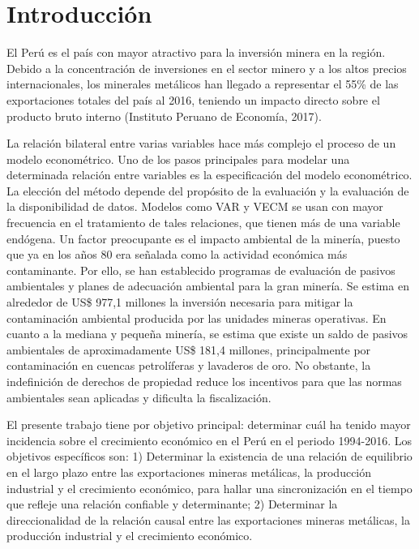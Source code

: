 \documentclass[11pt,]{article}
\begin{document}
\vskip 6.5pt

{
\hypersetup{linkcolor=black}
\setcounter{tocdepth}{2}
\tableofcontents
}

\noindent  \newpage

\hypertarget{introduccion}{%
\section{Introducción}\label{introduccion}}

El Perú es el país con mayor atractivo para la inversión minera en la
región. Debido a la concentración de inversiones en el sector minero y a
los altos precios internacionales, los minerales metálicos han llegado a
representar el 55\% de las exportaciones totales del país al 2016,
teniendo un impacto directo sobre el producto bruto interno (Instituto
Peruano de Economía, 2017).

La relación bilateral entre varias variables hace más complejo el
proceso de un modelo econométrico. Uno de los pasos principales para
modelar una determinada relación entre variables es la especificación
del modelo econométrico. La elección del método depende del propósito de
la evaluación y la evaluación de la disponibilidad de datos. Modelos
como VAR y VECM se usan con mayor frecuencia en el tratamiento de tales
relaciones, que tienen más de una variable endógena. Un factor
preocupante es el impacto ambiental de la minería, puesto que ya en los
años 80 era señalada como la actividad económica más contaminante. Por
ello, se han establecido programas de evaluación de pasivos ambientales
y planes de adecuación ambiental para la gran minería. Se estima en
alrededor de US\$ 977,1 millones la inversión necesaria para mitigar la
contaminación ambiental producida por las unidades mineras operativas.
En cuanto a la mediana y pequeña minería, se estima que existe un saldo
de pasivos ambientales de aproximadamente US\$ 181,4 millones,
principalmente por contaminación en cuencas petrolíferas y lavaderos de
oro. No obstante, la indefinición de derechos de propiedad reduce los
incentivos para que las normas ambientales sean aplicadas y dificulta la
fiscalización.

El presente trabajo tiene por objetivo principal: determinar cuál ha
tenido mayor incidencia sobre el crecimiento económico en el Perú en el
periodo 1994-2016. Los objetivos específicos son: 1) Determinar la
existencia de una relación de equilibrio en el largo plazo entre las
exportaciones mineras metálicas, la producción industrial y el
crecimiento económico, para hallar una sincronización en el tiempo que
refleje una relación confiable y determinante; 2) Determinar la
direccionalidad de la relación causal entre las exportaciones mineras
metálicas, la producción industrial y el crecimiento económico.
\end{document}

